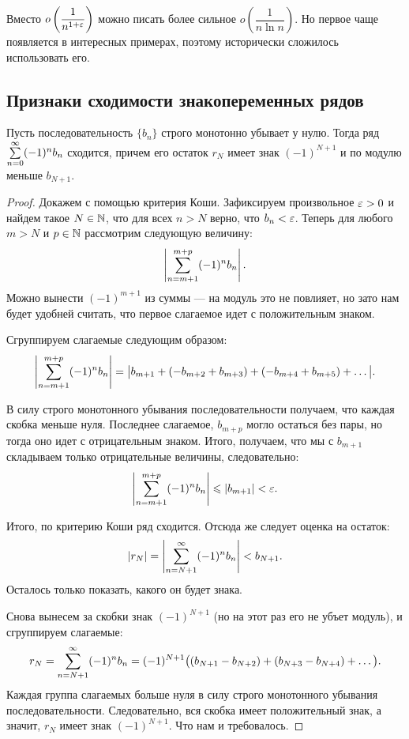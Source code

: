 \documentclass[a4paper, 12pt]{article}
\begin{document}
\begin{Comment}
Вместо $o\left(\dfrac{1}{n^{1+\varepsilon}} \right)$ можно писать более сильное $o\left(
\dfrac{1}{n\ln n} \right)$. Но первое чаще появляется в интересных примерах, поэтому исторически сложилось использовать его.
\end{Comment}

\subsection{Признаки сходимости знакопеременных рядов}
\begin{Test}
Пусть последовательность $\{b_n\}$ строго монотонно убывает у нулю. Тогда ряд $\sum\limits_{n=0}^{\infty}(-1)^nb_n$ сходится, причем его остаток $r_N$ имеет знак $(-1)^{N+1}$ и по модулю меньше $b_{N+1}$.
\end{Test}
\begin{proof}
Докажем с помощью критерия Коши. Зафиксируем произвольное $\varepsilon > 0$ и найдем такое $N \in \mathbb{N}$, что для всех $n > N$ верно, что $b_n < \varepsilon$. Теперь для любого $m > N$ и $p \in \mathbb{N}$ рассмотрим следующую величину:
$$
\left| \sum\limits_{n=m+1}^{m+p} (-1)^n b_n \right|.
$$  
Можно вынести $(-1)^{m+1}$ из суммы --- на модуль это не повлияет, но зато нам будет удобней считать, что первое слагаемое идет с положительным знаком.

Сгруппируем слагаемые следующим образом:
$$
\left| \sum\limits_{n=m+1}^{m+p} (-1)^n b_n \right| = \big|b_{m+1} + (- b_{m+2} + b_{m+3}) + (- b_{m+4} + b_{m+5}) + \ldots\big|.
$$

В силу строго монотонного убывания последовательности получаем, что каждая скобка меньше нуля. Последнее слагаемое, $b_{m+p}$ могло остаться без пары, но тогда оно идет с отрицательным знаком. Итого, получаем, что мы с $b_{m+1}$ складываем только отрицательные величины, следовательно:
$$
\left| \sum\limits_{n=m+1}^{m+p} (-1)^n b_n \right| \leqslant |b_{m+1}| < \varepsilon.
$$

Итого, по критерию Коши ряд сходится. Отсюда же следует оценка на остаток: 
$$
|r_N| = \left| \sum\limits_{n=N+1}^{\infty}(-1)^n b_n  \right| < b_{N+1}.
$$
Осталось только показать, какого он будет знака.

Снова вынесем за скобки знак $(-1)^{N+1}$ (но на этот раз его не убъет модуль), и сгруппируем слагаемые:
$$
r_N = \sum\limits_{n=N+1}^{\infty} (-1)^n b_n  = (-1)^{N+1}\big((b_{N+1} - b_{N+2}) + (b_{N+3} - b_{N+4}) + \ldots\big).$$
Каждая группа слагаемых больше нуля в силу строго монотонного убывания последовательности. Следовательно, вся скобка имеет положительный знак, а значит, $r_N$ имеет знак $(-1)^{N+1}$. Что нам и требовалось.
\end{proof}
\end{document}
